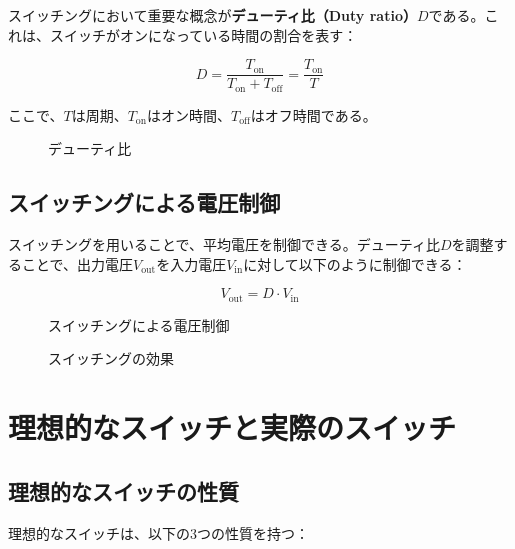スイッチングにおいて重要な概念が\textbf{デューティ比（Duty ratio）}$D$である。これは、スイッチがオンになっている時間の割合を表す：

\begin{equation}
D = \frac{T_{\text{on}}}{T_{\text{on}} + T_{\text{off}}} = \frac{T_{\text{on}}}{T}
\end{equation}

ここで、$T$は周期、$T_{\text{on}}$はオン時間、$T_{\text{off}}$はオフ時間である。

\begin{figure}[H]
\centering
{}
\caption{デューティ比}
\label{fig:duty_ratio}
\end{figure}

\subsection{スイッチングによる電圧制御}

スイッチングを用いることで、平均電圧を制御できる。デューティ比$D$を調整することで、出力電圧$V_{\text{out}}$を入力電圧$V_{\text{in}}$に対して以下のように制御できる：

\begin{equation}
V_{\text{out}} = D \cdot V_{\text{in}}
\end{equation}

\begin{figure}[H]
\centering
{}
\caption{スイッチングによる電圧制御}
\label{fig:switching_control}
\end{figure}

\begin{figure}[H]
\centering
{}
\caption{スイッチングの効果}
\label{fig:switching_effect}
\end{figure}

\section{理想的なスイッチと実際のスイッチ}

\subsection{理想的なスイッチの性質}

理想的なスイッチは、以下の3つの性質を持つ：

